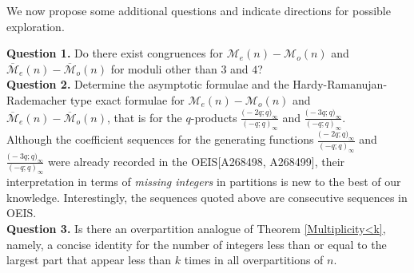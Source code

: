 \documentclass[12pt,reqno]{amsart}
\renewcommand{\(}{\left\(}
\renewcommand{\)}{\right\)}
\renewcommand{\[}{\left\[}
\renewcommand{\]}{\right\]}
\numberwithin{equation}{section}
\theoremstyle{plain}
\begin{document}
We now propose some additional questions and indicate directions for possible exploration.

\noindent \textbf{Question 1.} Do there exist congruences for $\mathcal{M}_e(n)-\mathcal{M}_o(n)$ and $\overline{\mathcal{M}}_e(n)-\overline{\mathcal{M}}_o(n)$ for moduli other than $3$ and $4$?\\
\textbf{Question 2.} Determine the asymptotic formulae and the Hardy-Ramanujan-Rademacher type exact formulae for $\mathcal{M}_e(n)-\mathcal{M}_o(n)$ and $\overline{\mathcal{M}}_e(n)-\overline{\mathcal{M}}_o(n)$, that is for the $q$-products $\frac{\big(-2q;q\big)_{\infty}}{(-q;q)_{\infty}}$ and $\frac{\big(-3q;q\big)_{\infty}}{(-q;q)_{\infty}}$. \\
Although the coefficient sequences for the generating functions $\frac{\big(-2q;q\big)_{\infty}}{(-q;q)_{\infty}}$ and $\frac{\big(-3q;q\big)_{\infty}}{(-q;q)_{\infty}}$ were already recorded in the OEIS[A268498, A268499], their interpretation in terms of \emph{missing integers} in partitions is new to the best of our knowledge. Interestingly, the sequences quoted above are consecutive sequences in OEIS. \\
\textbf{Question 3.} Is there an overpartition analogue of Theorem \ref{Multiplicity<k}, namely, a concise identity for the number of integers less than or equal to the largest part that appear less than $k$ times in all overpartitions of $n$.

\end{document}
